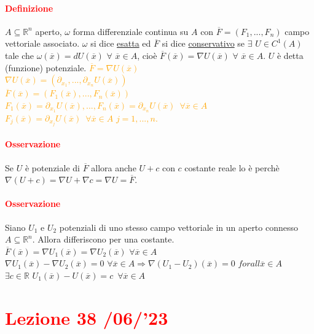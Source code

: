 \documentclass{article}
\newcommand{\R}{\mathbb{R}}
\begin{document}
\paragraph{\textcolor{red}{Definizione}}
$A \subseteq \R^n$ aperto, $\omega$ forma differenziale continua su $A$ con $\overline{F}=(F_1,...,F_n)$ campo vettoriale associato. $\omega$ si dice \underline{esatta} ed $\overline{F}$ si dice \underline{conservativo} se $\exists \,\,U \in  C^1(A)$ tale che $\omega(\overline{x})=dU(\overline{x})\,\, \forall\,\, \overline{x} \in A$, cioè $\overline{F}(\overline{x})=\nabla U(\overline{x})\,\, \forall\,\, \overline{x}\in A$. $U $ è detta (funzione) potenziale. 
\textcolor{orange}{$\overline{F} = \nabla U(\overline{x})$\\
$\nabla U(\overline{x})=(\partial_{x_1},..., \partial_{x_n}U(\overline{x}))$\\
$\overline{F}(\overline{x})=(F_1(\overline{x}),...,F_n(\overline{x}))$\\
$F_1(\overline{x}) =\partial_{x_1}U(\overline{x}),..., F_n(\overline{x})=\partial_{x_n} U(\overline{x})\,\,\, \forall \overline{x}\in A$\\
$F_j(\overline{x})=\partial_{x_j}U(\overline{x})\,\,\, \forall \overline{x}\in A\,\, j=1,...,n$.}

\paragraph{\textcolor{red}{Osservazione}}
Se $U$ è potenziale di $\overline{F}$ allora anche $U+c$ con $c$ costante reale lo è perchè $\nabla (U+c)=\nabla U+\nabla c= \nabla U = \overline{F}$.

\paragraph{\textcolor{red}{Osservazione}}
Siano $U_1$ e $U_2$ potenziali di uno stesso campo vettoriale in un aperto connesso $A \subseteq \R^n$. Allora differiscono per una costante. $\overline{F} (\overline{x})=\nabla U_1 (\overline{x})=\nabla U_2(\overline{x})\,\, \forall \overline{x}\in A $\\
$\nabla U_1(\overline{x})-\nabla U_2(\overline{x})=0\,\,\forall \overline{x}\in A \Rightarrow \nabla(U_1-U_2)(\overline{x})=0 \,\, forall \overline{x}\in A$\\
$\exists c \in \R \,\, U_1(\overline{x}) - U(\overline{x}) = c \,\,\, \forall \overline{x}\in A$

\newpage
\section{\textcolor{red}{Lezione 38 \space{}/06/'23}}
\end{document}
